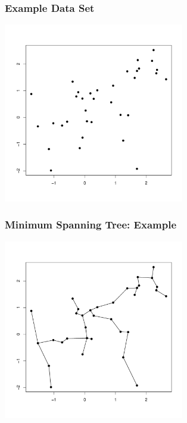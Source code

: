 \documentclass{beamer}
\begin{document}
\begin{frame}
  \frametitle{Example Data Set}

\begin{center}
\includegraphics[height=3.1in]{points-only}
\end{center}
\end{frame}

\begin{frame}
  \frametitle{Minimum Spanning Tree: Example}

  
\begin{center}
\includegraphics[height=3.1in]{points-mst}
\end{center}
\end{frame}
\end{document}
